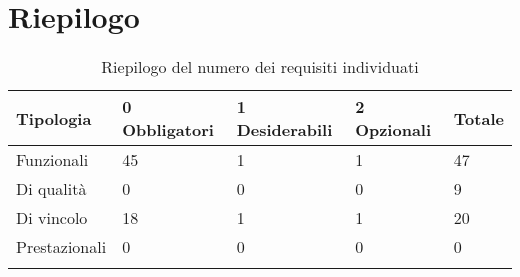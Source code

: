\documentclass[AnalisiDeiRequisiti.tex]{subfiles}
\begin{document}
\section{Riepilogo}

\label{table:Riepilogo del numero dei requisiti individuati}
\begin{longtable}[H]{|p{2.8cm}|p{2.9cm}|p{2.9cm}|p{2.9cm}|p{1.5cm}|}
	\hline
	\rowcolor[HTML]{38FFF8} 
	\textbf{Tipologia} & \textbf{0 Obbligatori} & \textbf{1 Desiderabili} & \textbf{2 Opzionali} & \textbf{Totale} \\ \hline
	Funzionali & 45 & 1 & 1 & 47 \\ \hline
	Di qualità & 0 & 0 & 0 & 9 \\ \hline
	Di vincolo & 18 & 1 & 1 & 20 \\ \hline
	Prestazionali & 0 & 0 & 0 & 0 \\ \hline
	
	\caption{Riepilogo del numero dei requisiti individuati}
\end{longtable}
\end{document}
